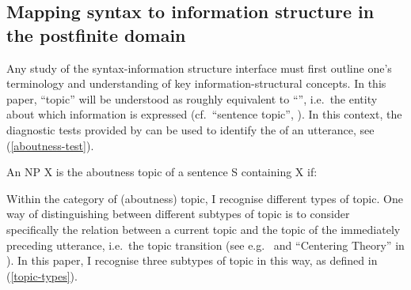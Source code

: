 \documentclass[output=paper,colorlinks,citecolor=brown]{langscibook}
\begin{document}
\subsection{Mapping syntax to information structure in the postfinite domain}

Any study of the syntax-information structure interface must first outline one's terminology and understanding of key information-structural concepts. 
In this paper, ``topic'' will be understood as roughly equivalent to ``'', i.e.~the entity about which information is expressed (cf.~``sentence topic'', \citealp{reinhart1981pragmatics}). 
In this context, the diagnostic tests provided by \citet[165]{gotze2007information} can be used to identify the  of an utterance, see (\ref{aboutness-test}).

\ea \label{aboutness-test}  An NP X is the aboutness topic of a sentence S containing X if:\\
\z 
\z
 
Within the category of (aboutness) topic, I recognise different types of topic. One way of distinguishing between different subtypes of topic is to consider specifically the relation between a current topic and the topic of the immediately preceding utterance, i.e.~the topic transition (see e.g.~\citealp{danes1974functional} and ``Centering Theory'' in \citealp{groszetal95}). In this paper, I recognise three subtypes of topic in this way, as defined in (\ref{topic-types}).
\end{document}
